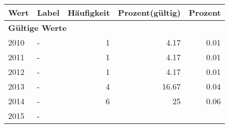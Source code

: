      \begin{longtable}{lXrrr}
     \toprule
     \textbf{Wert} & \textbf{Label} & \textbf{Häufigkeit} & \textbf{Prozent(gültig)} & \textbf{Prozent} \\
     \endhead
     \midrule
     \multicolumn{5}{l}{\textbf{Gültige Werte}}\\

     2010 &
     \multicolumn{1}{X}{ -  } &


       \num{1} &
       \num[round-mode=places,round-precision=2]{4.17} &
         \num[round-mode=places,round-precision=2]{0.01} \\

     2011 &
     \multicolumn{1}{X}{ -  } &


       \num{1} &
       \num[round-mode=places,round-precision=2]{4.17} &
         \num[round-mode=places,round-precision=2]{0.01} \\

     2012 &
     \multicolumn{1}{X}{ -  } &


       \num{1} &
       \num[round-mode=places,round-precision=2]{4.17} &
         \num[round-mode=places,round-precision=2]{0.01} \\

     2013 &
     \multicolumn{1}{X}{ -  } &


       \num{4} &
       \num[round-mode=places,round-precision=2]{16.67} &
         \num[round-mode=places,round-precision=2]{0.04} \\

     2014 &
     \multicolumn{1}{X}{ -  } &


       \num{6} &
       \num[round-mode=places,round-precision=2]{25} &
         \num[round-mode=places,round-precision=2]{0.06} \\

     2015 &
     \multicolumn{1}{X}{ -  } &



\end{longtable}
